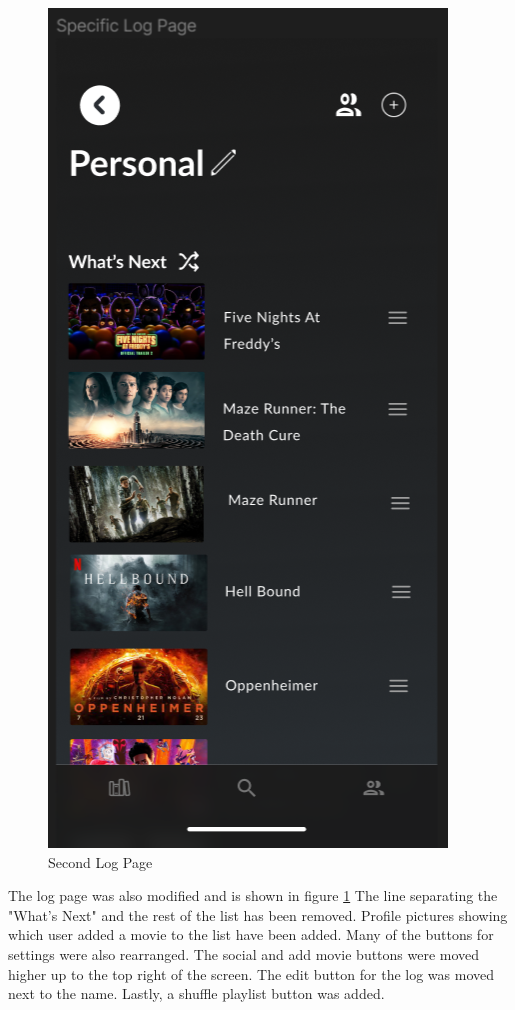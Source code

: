 \documentclass[12pt,asmart]{report}
\begin{document}
\begin{figure}[H]
    \centering
    \includegraphics[width=0.4\linewidth]{LogPage.png}
    \caption{Second Log Page}
    \label{JoshLog}
\end{figure}
The log page was also modified and is shown in figure \ref{JoshLog} The line separating the "What's Next" and the rest of the list has been removed. Profile pictures showing which user added a movie to the list have been added. Many of the buttons for settings were also rearranged. The social and add movie buttons were moved higher up to the top right of the screen. The edit button for the log was moved next to the name. Lastly, a shuffle playlist button was added.
\end{document}
